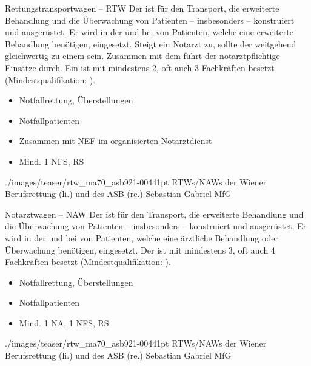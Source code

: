 \TextSlideTeaser
{Rettungstransportwagen -- RTW}%
{%
%
%
Der  ist für den Transport, die erweiterte
Behandlung und die Überwachung von Patienten -- insbesonders
 -- konstruiert und ausgerüstet. Er
wird in der  und bei  von Patienten,
welche eine erweiterte Behandlung benötigen, eingesetzt.
Steigt ein Notarzt zu, sollte der  weitgehend
gleichwertig zu einem  sein.
Zusammen mit dem  führt der 
notarztpflichtige Einsätze durch.
Ein  ist mit mindestens 2, oft auch 3 Fachkräften besetzt
(Mindestqualifikation: ).
}%
{%
\begin{itemize}
  \item Notfallrettung, Überstellungen 
  \item Notfallpatienten
  \item Zusammen mit NEF im organisierten Notarztdienst
  \item Mind. 1 NFS,  RS
\end{itemize}}%
{./images/teaser/rtw_ma70_asb921-00441pt}%
{RTWs/NAWs der Wiener Berufsrettung (li.) und des ASB (re.)}%
{}%
{Sebastian Gabriel}%
{MfG}%


\TextSlideTeaser
{Notarztwagen -- NAW}%
{%
%
%
Der  ist für den Transport, die erweiterte
 Behandlung und die Überwachung von Patienten
-- insbesonders  -- konstruiert und ausgerüstet.
Er wird in der  und bei  von
Patienten, welche eine ärztliche Behandlung oder Überwachung
benötigen, eingesetzt.
Der  ist mit mindestens 3, oft auch 4 Fachkräften besetzt
(Mindestqualifikation: ).}%
{
\begin{itemize}
  \item Notfallrettung, Überstellungen 
  \item Notfallpatienten
  \item Mind. 1 NA, 1 NFS,  RS
\end{itemize}}%
{./images/teaser/rtw_ma70_asb921-00441pt}%
{RTWs/NAWs der Wiener Berufsrettung (li.) und des ASB (re.)}%
{}%
{Sebastian Gabriel}%
{MfG}%


